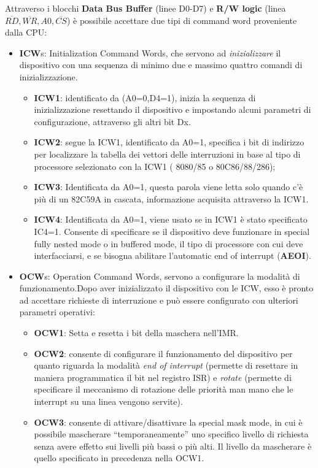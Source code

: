 Attraverso i blocchi \textbf{Data Bus Buffer} (linee D0-D7) e \textbf{R/W logic} (linea $ \overline{RD}, \overline{WR}, A0, \overline{CS} $) è possibile accettare due tipi di command word proveniente dalla CPU:
\begin{itemize}
    \item \textbf{ICW}s: Initialization Command Words, che servono ad \textit{inizializzare} il dispositivo con una sequenza di minimo due e massimo quattro comandi di inizializzazione.
    \begin{itemize}
        \item \textbf{ICW1}: identificato da (A0=0,D4=1), inizia la sequenza di inizializzazione resettando il dispositivo e impostando alcuni parametri di configurazione, attraverso gli altri bit Dx.
        \item \textbf{ICW2}: segue la ICW1, identificato da A0=1, specifica i bit di indirizzo per localizzare la tabella dei vettori delle interruzioni in base al tipo di processore selezionato con la ICW1 ( 8080/85 o 80C86/88/286);
        \item \textbf{ICW3}: Identificata da A0=1, questa parola viene letta solo quando c'è più di un 82C59A in cascata, informazione acquisita attraverso la ICW1.
        \item \textbf{ICW4}: Identificata da A0=1, viene usato se in ICW1 è stato specificato IC4=1. Consente di specificare se il dispositivo deve funzionare in special fully nested mode o in buffered mode, il tipo 
        di processore con cui deve interfacciarsi, e se bisogna abilitare l'automatic end of interrupt (\textbf{AEOI}).
    \end{itemize}
    \item \textbf{OCW}s: Operation Command Words, servono a configurare la modalità di funzionamento.Dopo aver inizializzato il dispositivo con le ICW, esso è pronto ad accettare richieste di interruzione e può essere configurato con ulteriori parametri operativi:
    \begin{itemize}
        \item \textbf{OCW1}: Setta e resetta i bit della maschera nell'IMR.
        \item \textbf{OCW2}: consente di configurare il funzionamento del dispositivo per quanto riguarda la modalità \textit{end of interrupt} (permette di resettare in maniera programmatica il bit nel registro ISR) e \textit{rotate} (permette di specificare il meccanismo di rotazione delle priorità man mano che le interrupt su una linea vengono servite).
        \item \textbf{OCW3}:  consente di attivare/disattivare la special mask mode, in cui è possibile mascherare  “temporaneamente” uno specifico livello di richiesta senza avere effetto sui livelli più bassi o più alti. Il livello da mascherare è quello specificato in precedenza nella OCW1.
    \end{itemize}
\end{itemize}


